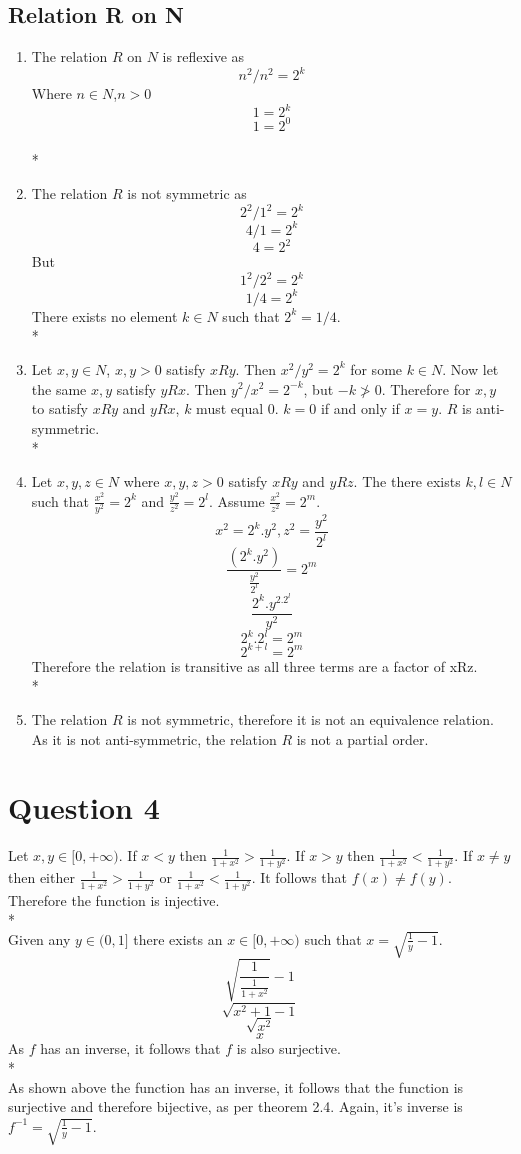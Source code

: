\documentclass[a4paper,12pt]{article}
\begin{document}
\subsection{Relation R on N}
\begin{enumerate}
  \item
    The relation $R$ on $N$ is reflexive as \[n^2 / n^2 = 2^k\]
Where $n \in N$,$n > 0$
\[1 = 2^k\]
\[1 = 2^0\]
\\*
\\
\item
  The relation $R$ is not symmetric as \[ 2^2 / 1^2 = 2^k\]
\[4 / 1 = 2^k\]
\[ 4 = 2^2\]
But \[ 1^2 / 2^2 = 2^k\]
\[ 1 / 4 = 2^k\]
There exists no element $k \in N$ such that $2^k = 1/4$.
\\*
\\
\item
Let $x,y \in N$, $x,y > 0$ satisfy $xRy$. Then $x^2 / y^2 = 2^k$ for some $k \in N$.
Now let the same $x,y$ satisfy $yRx$. 
Then $y^2 / x^2 = 2^{-k}$, but $-k \not> 0$. 
Therefore for $x,y$ to satisfy $xRy$ and $yRx$, $k$ must equal $0$. $k = 0$ if and only if $x = y$. $R$ is anti-symmetric.
\\*
\\
\item
 Let $x,y,z \in N$ where $x,y,z > 0$ satisfy $xRy$ and $yRz$. 
 The there exists $k,l \in N$ such that $\frac{x^2}{y^2} = 2^k$ and $\frac{y^2}{z^2} = 2^l$. Assume $\frac{x^2}{z^2} = 2^m$.
  \[x^2 = 2^k.y^2 , z^2 = \frac{y^2}{2^l}\]
  \[\frac{(2^k.y^2)}{\frac{y^2}{2^l}} = 2^m\]
  \[\frac{2^k.y^2.2^l}{y^2}\]
  \[2^k.2^l = 2^m\]
  \[2^{k + l} = 2^m\]
  Therefore the relation is transitive as all three terms are a factor of xRz.
\\*
\\
\item 
  The relation $R$ is not symmetric, therefore it is not an equivalence relation.
As it is not anti-symmetric, the relation $R$ is not a partial order.
\end{enumerate}
\section{Question 4} 
Let $x,y \in [0,+\infty)$. If $x < y$ then $\frac{1}{1 + x^2} > \frac{1}{1 + y^2}$. 
If $x > y$ then $\frac{1}{1 + x^2} < \frac{1}{1 + y^2}$. If $x \not= y$ then either 
$\frac{1}{1 + x^2} > \frac{1}{1 + y^2}$ or $\frac{1}{1 + x^2} < \frac{1}{1 + y^2}$. It follows that $f(x) \not= f(y)$.
Therefore the function is injective.
\\*
\\
Given any $y \in (0,1]$ there exists an $x \in [0,+\infty)$ such that $x = \sqrt{\frac{1}{y} -1}$.
\[\sqrt{\frac{1}{\frac{1}{1 + x^2}}} -1 \]
\[\sqrt{x^2 + 1 - 1} \]
\[\sqrt{x^2}\]
\[x\]
As $f$ has an inverse, it follows that $f$ is also surjective.
\\*
\\
As shown above the function has an inverse, it follows that the function is surjective and therefore bijective, 
as per theorem 2.4.
Again, it's inverse is $f^{-1} =  \sqrt{\frac{1}{y} -1}$.
\end{document}

